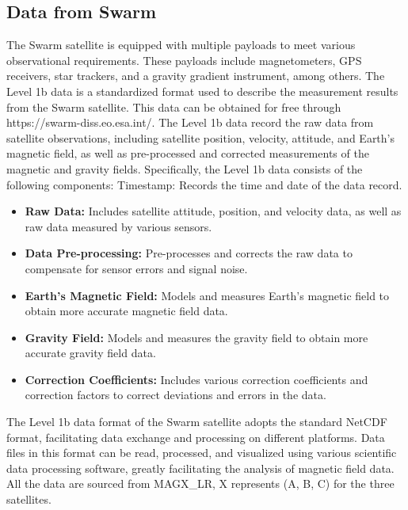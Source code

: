 \documentclass[3p,authoryear,preprint,12pt]{elsarticle}
\begin{document}
\subsection{Data from Swarm}
The Swarm satellite is equipped with multiple payloads to meet various observational requirements. These payloads include magnetometers, GPS receivers, star trackers, and a gravity gradient instrument, among others. The Level 1b data is a standardized format used to describe the measurement results from the Swarm satellite. This data can be obtained for free through https://swarm-diss.eo.esa.int/. The Level 1b data {record} the raw data from satellite observations, including satellite position, velocity, attitude, and Earth's magnetic field, as well as pre-processed and corrected measurements of the magnetic and gravity fields. Specifically, the Level 1b data consists of the following components:
Timestamp: Records the time and date of the data record.
\begin{itemize}
	\item \textbf{Raw Data:} Includes satellite attitude, position, and velocity data, as well as raw data measured by various sensors.
	\item \textbf{Data Pre-processing:}	Pre-processes and corrects the raw data to compensate for sensor errors and signal noise.
	\item \textbf{Earth's Magnetic Field:} Models and measures Earth's magnetic field to obtain more accurate magnetic field data.
	\item \textbf{Gravity Field:} Models and measures the gravity field to obtain more accurate gravity field data.
	\item \textbf{Correction Coefficients:} Includes various correction coefficients and correction factors to correct deviations and errors in the data.	
\end{itemize}

The Level 1b data format of the Swarm satellite adopts the standard NetCDF format, facilitating data exchange and processing on different platforms. Data files in this format can be read, processed, and visualized using various scientific data processing software, greatly facilitating the analysis of magnetic field data. {All the data are sourced from MAGX\_LR, X represents (A, B, C) for the three satellites.}

\end{document}
